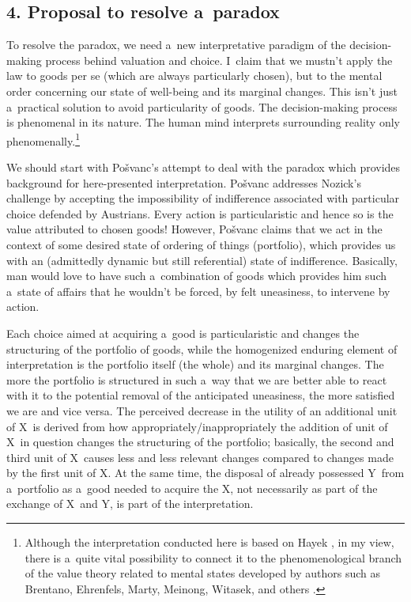 \subsection*{4. Proposal to resolve a~paradox }



To resolve the paradox, we need a~new interpretative paradigm of the decision-making process behind valuation and choice. I~claim that we mustn't apply the law to goods per se (which are always particularly chosen), but to the mental order concerning our state of well-being and its marginal changes. This isn't just a~practical solution to avoid particularity of goods. The decision-making process is phenomenal in its nature. The human mind interprets surrounding reality only phenomenally.\footnote{Although the interpretation conducted here is based on Hayek 
\parencite*[][]{}, %
 in my view, there is a~quite vital possibility to connect it to the phenomenological branch of the value theory related to mental states developed by authors such as Brentano, Ehrenfels, Marty, Meinong, Witasek, and others 
\parencites[see][]{}[][]{}.%
}



We should start with Pošvanc's 
\parencite*[][]{} %
 attempt to deal with the paradox which provides background for here-presented interpretation. Pošvanc addresses Nozick's challenge by accepting the impossibility of indifference associated with particular choice defended by Austrians. Every action is particularistic and hence so is the value attributed to chosen goods! However, Pošvanc claims that we act in the context of some desired state of ordering of things (portfolio), which provides us with an (admittedly dynamic but still referential) state of indifference. Basically, man would love to have such a~combination of goods which provides him such a~state of affairs that he wouldn't be forced, by felt uneasiness, to intervene by action.



Each choice aimed at acquiring a~good is particularistic and changes the structuring of the portfolio of goods, while the homogenized enduring element of interpretation is the portfolio itself (the whole) and its marginal changes. The more the portfolio is structured in such a~way that we are better able to react with it to the potential removal of the anticipated uneasiness, the more satisfied we are and vice versa. The perceived decrease in the utility of an additional unit of X~is derived from how appropriately/inappropriately the addition of unit of X~in question changes the structuring of the portfolio; basically, the second and third unit of X~causes less and less relevant changes compared to changes made by the first unit of X. At the same time, the disposal of already possessed Y~from a~portfolio as a~good needed to acquire the X, not necessarily as part of the exchange of X~and Y, is part of the interpretation.



